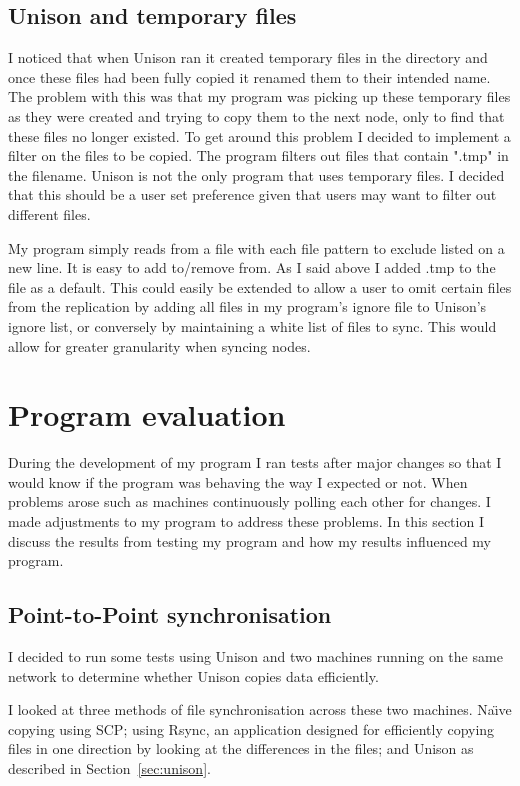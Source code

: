 \documentclass[12pt]{article}
\begin{document}
\subsection{Unison and temporary files}
\label{sec:uni_and_tmp}
I noticed that when Unison ran it created temporary files in the
directory and once these files had been fully copied it renamed
them to their intended name. The problem with this was that my program
was picking up these temporary files as they were created and trying to
copy them to the next node, only to find that these files no longer existed.
To get around this problem I decided to implement a filter on the files to
be copied. The program filters out files that contain ".tmp" in the filename.
Unison is not the only program that uses temporary files. I decided that this
should be a user set preference given that users may want to filter out different
files.

My program simply reads from a file with each file pattern to exclude
listed on a new line. It is easy to add to/remove from. As I said above
I added .tmp to the file as a default. This could easily be extended
to allow a user to omit certain files from the replication by adding
all files in my program's ignore file to Unison's ignore list, or conversely
by maintaining a white list of files to sync. This would allow for
greater granularity when syncing nodes.

\newpage
\section{Program evaluation}
During the development of my program I ran tests after major
changes so that I would know if the program was behaving the
way I expected or not.
When problems arose such as machines continuously polling each
other for changes. I made adjustments to my program to address
these problems.
In this section I discuss
the results from testing my program
and how my results influenced my program.

\subsection{Point-to-Point synchronisation}
\label{sec:point_to_point}
I decided to run some tests using Unison 
and two machines running on the same network to 
determine whether Unison copies data efficiently.

I looked at three methods of file synchronisation across
these two machines. Na\"{\i}ve copying using SCP; using Rsync, an application
designed for efficiently copying files in one direction by looking at
the differences in the files; and Unison as described in Section~\ref{sec:unison}.
\end{document}
